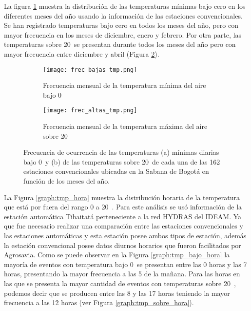 La figura \ref{graph:tmp_bajo_meses} muestra la distribución de las temperaturas mínimas bajo cero en los diferentes meses del año usando la información de las estaciones convencionales. Se han registrado temperaturas bajo cero en todos los meses del año, pero con mayor frecuencia en los meses de diciembre, enero y febrero. Por otra parte, las temperaturas sobre 20\celc \  se presentan durante todos los meses del año pero con mayor frecuencia entre diciembre y abril (Figura \ref{graph:tmp_sobre_meses}).


\begin{figure}[H]
	\begin{subfigure}[b]{\linewidth}
	\begin{center}
    		\caption{Frecuencia mensual de la temperatura mínima del aire bajo 0\celc \ }
	\texttt{[image: frec\_bajas\_tmp.png]}
		

		\label{graph:tmp_bajo_meses}
		
	\end{center}
	\end{subfigure}
	
	\begin{subfigure}[b]{\linewidth}
	\begin{center}
    \caption{Frecuencia mensual de la temperatura máxima del aire sobre 20\celc \ }
	\texttt{[image: frec\_altas\_tmp.png]}
		
		
		\label{graph:tmp_sobre_meses}
		
	\end{center}
	\end{subfigure}
	
	
	\caption{Frecuencia de ocurrencia de las temperaturas (a) mínimas diarias bajo 0\celc \  y (b) de las temperaturas sobre 20\celc \ de cada una de las 162 estaciones convencionales ubicadas en la Sabana de Bogotá en función de los meses del año.}
	\label{graph:tmp_meses}

\end{figure}



La Figura \ref{graph:tmp_hora} muestra la distribución horaria de la temperatura que está por fuera del rango 0 a 20\celc \ . Para este análisis se usó información de la estación automática Tibaitatá perteneciente a la red HYDRAS del IDEAM. Ya que fue necesario realizar una comparación entre las estaciones convencionales y las estaciones automáticas y esta estación posee ambos tipos de estación, además la estación convencional posee datos diurnos horarios que fueron facilitados por Agrosavia. Como se puede observar en la Figura \ref{graph:tmp_bajo_hora} la mayoría de eventos con temperatura bajo 0\celc \  se presentan entre las 0 horas y las 7 horas, presentando la mayor frecuencia a las 5 de la mañana. Para las horas en las que se presenta la mayor cantidad de eventos con temperaturas sobre 20\celc \ , podemos decir que se producen entre las 8 y las 17 horas teniendo la mayor frecuencia a las 12 horas (ver Figura \ref{graph:tmp_sobre_hora}).



